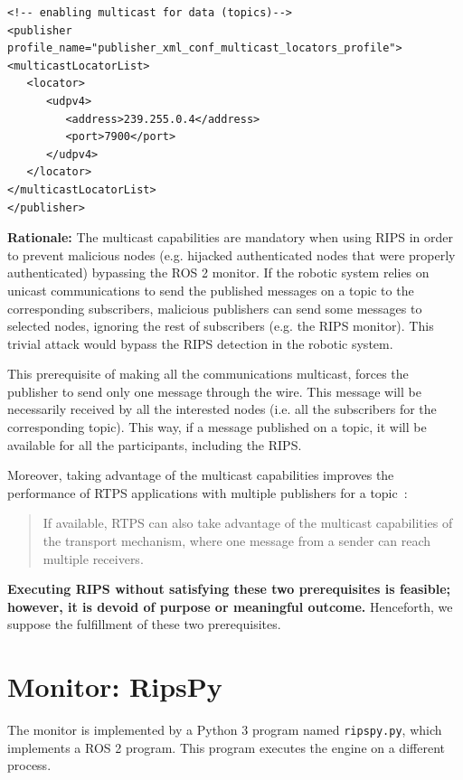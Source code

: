 \documentclass[a4paper]{article}
\begin{document}
\begin{enumerate}
{\begin{verbatim}
<!-- enabling multicast for data (topics)-->
<publisher profile_name="publisher_xml_conf_multicast_locators_profile">
<multicastLocatorList>
   <locator>
      <udpv4>
         <address>239.255.0.4</address>
         <port>7900</port>
      </udpv4>
   </locator>
</multicastLocatorList>
</publisher>
\end{verbatim}
}

	\textbf{Rationale:} The multicast capabilities are mandatory when using RIPS
	in order to prevent malicious nodes (e.g. hijacked authenticated nodes that were
	properly authenticated) bypassing the ROS 2 monitor. If the robotic system
	relies on unicast communications to send the published messages on a topic
	to the corresponding
	subscribers, malicious publishers can send some messages to
	selected nodes, ignoring the rest of subscribers (e.g. the RIPS monitor).
	This trivial attack would bypass the RIPS detection in the robotic system.

	This prerequisite of making all the communications multicast, forces the publisher to
	send only one message through the wire. This message will be necessarily received
	by all the interested nodes (i.e. all the subscribers for the corresponding topic).
	This way, if a message published on a topic, it will be available for all the
	participants, including the RIPS.

	Moreover, taking advantage of the multicast capabilities
	improves the performance
	of RTPS applications with multiple publishers for a topic~\cite{rtps-doc}:

	\begin{quote}
		If available, RTPS can also take advantage of the multicast
		capabilities of the transport mechanism, where one message from
		a sender can reach multiple receivers.
	\end{quote}
\end{enumerate}

\textbf{Executing RIPS without satisfying these two prerequisites
is feasible; however, it is devoid of purpose or meaningful outcome.}
Henceforth, we suppose the fulfillment of these two prerequisites.


\section{Monitor: RipsPy}

The monitor is implemented by a Python 3 program named \texttt{ripspy.py},
which implements a ROS 2 program.
This program executes the engine on a different process.
\end{document}
